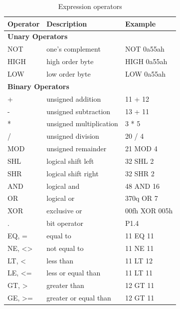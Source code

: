 \documentclass[a4paper,twoside,12pt]{book}
\newcommand{\mysmallfont}{\fontsize{8pt}{10pt} \selectfont{}}
\begin{document}
		\begin{table}[h!]
			\mysmallfont{}
			\centering{}
			\begin{tabular}{|l|l|l|}
				\hline
				Operator	& Description			& Example		\\\hline
				\multicolumn{3}{|l|}{\textbf{Unary Operators}} \\\hline
				NOT		& one's complement		& NOT 0a55ah		\\\hline
				HIGH		& high order byte		& HIGH 0a55ah		\\\hline
				LOW		& low order byte		& LOW 0a55ah		\\\hline
				\multicolumn{3}{|l|}{\textbf{Binary Operators}} \\\hline
				+		& unsigned addition		& 11 + 12		\\\hline
				-		& unsigned subtraction		& 13 + 11		\\\hline
				*		& unsigned multiplication	& 3 * 5			\\\hline
				/		& unsigned division		& 20 / 4		\\\hline
				MOD		& unsigned remainder		& 21 MOD 4		\\\hline
				SHL		& logical shift left		& 32 SHL 2		\\\hline
				SHR		& logical shift right		& 32 SHR 2		\\\hline
				AND		& logical and			& 48 AND 16		\\\hline
				OR		& logical or			& 370q OR 7		\\\hline
				XOR		& exclusive or			& 00fh XOR 005h		\\\hline
				.		& bit operator			& P1.4			\\\hline
				EQ, = 		& equal to			& 11 EQ 11		\\\hline
				NE, <>		& not equal to			& 11 NE 11		\\\hline
				LT, < 		& less than			& 11 LT 12		\\\hline
				LE, <=		& less or equal than		& 11 LT 11		\\\hline
				GT, > 		& greater than			& 12 GT 11		\\\hline
				GE, >=		& greater or equal than		& 12 GT 11		\\\hline
			\end{tabular}
			\caption{Expression operators}
		\end{table}
\end{document}
